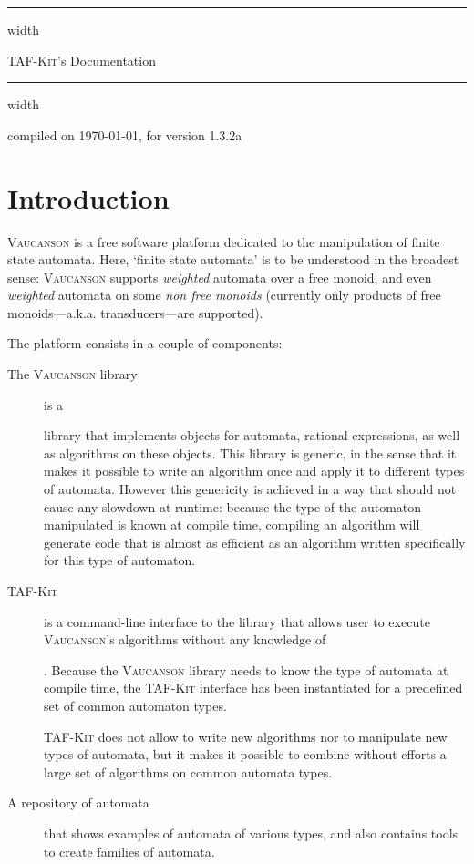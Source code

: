 \documentclass[a4paper]{report}
\makeatletter
\newcommand{\Cxx}{%
  \valign{\vfil\hbox{##}\vfil\cr
    {C\kern-.1em}\cr
    $\hbox{\fontsize\sf@size\z@\textbf{+\kern-0.05em+}}$\cr}%
    \xspace
}
\def\VcsnVersion{1.3.2a}
\newcommand{\tafkit}{\textsc{TAF-Kit}\xspace}
\newcommand{\Vauc}{\textsc{Vaucanson}\xspace}
\def\manualtitle{\tafkit's Documentation}
\makeatother
\begin{document}
\vspace*{50pt}
\vskip4pt \hrule height 4pt width \hsize \vskip4pt
\begin{center}
  \Huge \manualtitle
\end{center}
\vspace*{-1.5ex}
\vskip4pt \hrule height 4pt width \hsize \vskip4pt

\hfill compiled on \today, for version \VcsnVersion

\vfill

\setcounter{tocdepth}{2}
\makeatletter
{}
\makeatother

\vfill

\chapter*{Introduction}
\label{sec:intro}

\Vauc is a free software platform dedicated to the manipulation of
finite state automata.  Here, `finite state automata' is to be
understood in the broadest sense: \Vauc supports \emph{weighted}
automata over a free monoid, and even \emph{weighted} automata on some
\emph{non free monoids} (currently only products of free
monoids---a.k.a. transducers---are supported).

\bigskip

The platform consists in a couple of components:
\begin{description}
\item[The \Vauc library] is a \Cxx library that implements objects for
  automata, rational expressions, as well as algorithms on these
  objects.  This library is generic, in the sense that it makes it
  possible to write an algorithm once and apply it to different types
  of automata.  However this genericity is achieved in a way that
  should not cause any slowdown at runtime: because the type of the
  automaton manipulated is known at compile time, compiling an
  algorithm will generate code that is almost as efficient as an
  algorithm written specifically for this type of automaton.

\item[\tafkit] is a command-line interface to the library that allows
  user to execute \Vauc's algorithms without any knowledge of \Cxx.
  Because the \Vauc library needs to know the type of automata at
  compile time, the \tafkit interface has been instantiated for a
  predefined set of common automaton types.

  \tafkit does not allow to write new algorithms nor to manipulate new
  types of automata, but it makes it possible to combine without
  efforts a large set of algorithms on common automata types.

\item[A repository of automata] that shows examples of automata of
  various types, and also contains tools to create families of
  automata.
\end{description}
\end{document}

